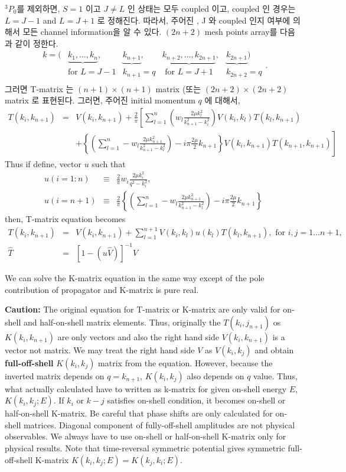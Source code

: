 \documentclass[10pt]{book}
\newcommand{\bea}{\begin{eqnarray}}
\newcommand{\eea}{\end{eqnarray}}
\newcommand{\no}{\nonumber \\}
\begin{document}
${}^3P_0$를 제외하면, $S=1$ 이고 $J\neq L$ 인 상태는 모두 coupled 이고,
coupled 인 경우는 $L=J-1$ and $L=J+1$ 로 정해진다. 따라서, 주어진 ,
J 와 coupled 인지 여부에 의해서 모든 channel information을 알 수 있다.
$(2n+2)$ mesh points array를 다음과 같이 정한다. 
\begin{equation}
\begin{array}{ccccc} 
k=( & \underbrace{k_1,\dots,k_n},&\underbrace{ k_{n+1}},&
   \underbrace{k_{n+2},\dots,k_{2n+1}}, & \underbrace{k_{2n+1}}) \\
    & \mbox{for $L=J-1$}  & k_{n+1}=q  & \mbox{ for $L=J+1$} & k_{2n+2}=q \\
    \end{array}.
\end{equation}
 그러면 T-matrix 는 $(n+1)\times(n+1)$ matrix 
 (또는 $(2n+2)\times(2n+2)$ matrix
로 표현된다. 그러면, 주어진 initial momentum $q$ 에 대해서,
\bea
T(k_i,k_{n+1})&=&V(k_i,k_{n+1})
+\frac{2}{\pi}\left[\sum_{l=1}^{n} 
 \left( w_l \frac{2\mu k_l^2 }{k^2_{n+1}-k_i^2}\right) 
  V(k_i,k_l)T(k_l,k_{n+1})
  \right.\no 
& &+ \left. \left\{\left(\sum_{l=1}^n  -w_l\frac{2\mu k_{n+1}^2 }{k_{n+1}^2-k_l^2}\right)
   -i\pi \frac{2\mu}{2} k_{n+1}\right\} 
    V(k_i,k_{n+1})T(k_{n+1},k_{n+1})
\right]
\eea
Thus if define, vector $u$ such that
\bea
u(i=1:n)&\equiv& \frac{2}{\pi} w_i\frac{2\mu k_i^2}{q^2-k_i^2},\no
u(i=n+1)&\equiv& \frac{2}{\pi}
         \left\{\left(\sum_{l=1}^n  -w_l\frac{2\mu k_{n+1}^2 }{k_{n+1}^2-k_l^2}\right)
   -i\pi \frac{2\mu}{2} k_{n+1}\right\}
\eea
then, T-matrix equation becomes
\bea
T(k_i,k_{n+1})&=&V(k_i,k_{n+1})
 +\sum_{l=1}^{n+1} V(k_i,k_l)u(k_l) T(k_l,k_{n+1}),
\mbox{ for $i,j=1\dots n+1$},\no
\hat{T}&=&[1-(u \hat{V})]^{-1} \hat{V}
\eea

We can solve the K-matrix equation in the same way except of the pole
contribution of propagator and K-matrix is pure real.

{\bf Caution:} The original equation for T-matrix or K-matrix are only valid for 
on-shell and half-on-shell matrix elements. Thus, originally the 
$T(k_i,j_{n+1})$ os $K(k_i,k_{n+1})$ are only vectors
and also the right hand side $V(k_i,k_{n+1})$ is a vector not matrix.
We may treat the right hand side $V$ as $V(k_i,k_j)$ and obtain 
{\bf full-off-shell} $K(k_i,k_j)$ matrix from the equation. 
However, because the inverted matrix
depends on $q=k_{n+1}$,  $K(k_i,k_j)$ also depends on $q$ value. 
Thus, what actually calculated have to written as 
k-matrix for given on-shell energy $E$, $K(k_i,k_j;E)$.
If $k_i$ or $k-j$ satisfies on-shell condition, it becomes
on-shell or half-on-shell K-matrix. Be careful that phase shifts
are only calculated for on-shell matrices. Diagonal component of fully-off-shell
amplitudes are not physical observables.
We always have to use on-shell or half-on-shell K-matrix
only for physical results. Note that time-reversal symmetric potential
gives symmetric full-off-shell K-matrix $K(k_i,k_j;E)=K(k_j,k_i;E)$.
\end{document}
